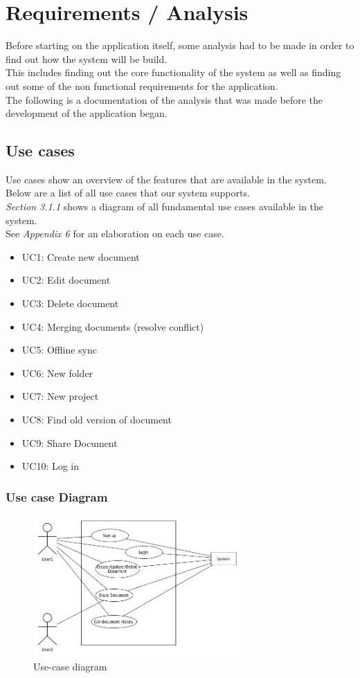 \documentclass[11pt]{article}
\begin{document}
\section{Requirements / Analysis}
\label{sec-2}
Before starting on the application itself, some analysis had to be made in order to find out how the system will be build. \\
This includes finding out the core functionality of the system as well as finding out some of the non functional requirements for the application. \\
The following is a documentation of the analysis that was made before the development of the application began.
\subsection{Use cases}
\label{sec-2-1}
Use cases show an overview of the features that are available in the system. Below are a list of all use cases that our system supports. \\
\emph{Section 3.1.1} shows a diagram of all fundamental use cases available in the system. \\
See \emph{Appendix 6} for an elaboration on each use case. \\

\begin{itemize}
\item UC1: Create new document
\item UC2: Edit document
\item UC3: Delete document
\item UC4: Merging documents (resolve conflict)
\item UC5: Offline sync
\item UC6: New folder
\item UC7: New project
\item UC8: Find old version of document
\item UC9: Share Document
\item UC10: Log in
\end{itemize}
\subsubsection{Use case Diagram}
\label{sec-2-1-1}
\begin{figure}[H]
  		\centering
    	\includegraphics[width=300px]{images/UpdatedUsecaseDiagram.jpg}
    	\caption{Use-case diagram}
	\end{figure}
\end{document}
